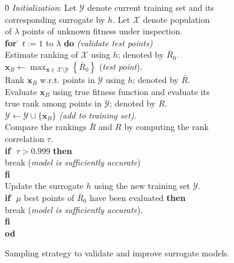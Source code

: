 \documentclass[conference]{IEEEtran}
\renewcommand{\vec}[1]{{\mbox{\boldmath$#1$}}}
\renewcommand{\vec}[1]{{\mathbf #1}}
\begin{document}
\begin{figure}[t!]
\centering \noindent 
{\footnotesize
\begin{tabbing}
\quad \quad \= 0\;\; \= \emph{Initialization}: Let $\mathcal{Y}$ denote current training set and its \\
\>   \> corresponding surrogate by $h$. Let $\mathcal{X}$ denote population \\
\>   \> of $\lambda$ points of unknown fitness under inspection.\\
  \> {\bf for} \= $t := 1$ to $\lambda$ {\bf do} \emph{(validate test points)}\\ 
  \>\> Estimate ranking of $\mathcal{X}$ using $h$; denoted by $\bar{R}_0$. \\
  \>\> $\vec{x}_B \leftarrow \max_{\vec{x}\in\mathcal{X}\setminus\mathcal{Y}}\left\{\bar{R}_0\right\}$ (\emph{test point}). \\
  \>\> Rank $\vec{x}_B$ w.r.t. points in $\mathcal{Y}$ using $h$; denoted by $\bar{R}$. \\
  \>\> Evaluate $\vec{x}_B$ using true fitness function and evaluate its\\
\>   \>\> true rank among  points in $\mathcal{Y}$; denoted by $R$. \\ 
  \>\> $\mathcal{Y}\leftarrow\mathcal{Y}\cup\{\vec{x}_B\}$ \emph{(add to training set)}. \\
  \>\> Compare the rankings  $\bar{R}$ and $R$ by computing the rank \\
\>   \>\> correlation $\tau$.\\
  \>\> {\bf if} \= $\tau>0.999$ {\bf then} \\
  \>\> \> break (\emph{model is sufficiently accurate}) \\
 \>\> {\bf fi} \\
  \>\> Update the surrogate $h$ using the new training set $\mathcal{Y}$.\\
  \>\> {\bf if} \= $\mu$ best points of $\bar{R}_0$ have been evaluated {\bf then} \\
  \>\> \> break (\emph{model is sufficiently accurate}). \\
  \>\> {\bf fi} \\
  \> {\bf od}\\
\end{tabbing}}
\caption{Sampling strategy to validate and improve surrogate models.}\label{fig:improvedmodel}
\end{figure}
\end{document}
